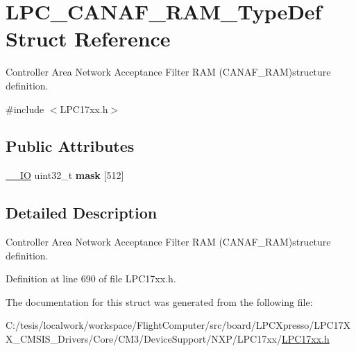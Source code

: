 \hypertarget{struct_l_p_c___c_a_n_a_f___r_a_m___type_def}{\section{\-L\-P\-C\-\_\-\-C\-A\-N\-A\-F\-\_\-\-R\-A\-M\-\_\-\-Type\-Def \-Struct \-Reference}
\label{struct_l_p_c___c_a_n_a_f___r_a_m___type_def}
}


\-Controller \-Area \-Network \-Acceptance \-Filter \-R\-A\-M (\-C\-A\-N\-A\-F\-\_\-\-R\-A\-M)structure definition.  




{\ttfamily \#include $<$\-L\-P\-C17xx.\-h$>$}

\subsection*{\-Public \-Attributes}
\begin{DoxyCompactItemize}
\item 
\hypertarget{struct_l_p_c___c_a_n_a_f___r_a_m___type_def_a4aa976ce2626f44c67748abac073c9b6}{\hyperlink{group___c_m_s_i_s__core__definitions_gaec43007d9998a0a0e01faede4133d6be}{\-\_\-\-\_\-\-I\-O} uint32\-\_\-t {\bfseries mask} \mbox{[}512\mbox{]}}\label{struct_l_p_c___c_a_n_a_f___r_a_m___type_def_a4aa976ce2626f44c67748abac073c9b6}

\end{DoxyCompactItemize}


\subsection{\-Detailed \-Description}
\-Controller \-Area \-Network \-Acceptance \-Filter \-R\-A\-M (\-C\-A\-N\-A\-F\-\_\-\-R\-A\-M)structure definition. 

\-Definition at line 690 of file \-L\-P\-C17xx.\-h.



\-The documentation for this struct was generated from the following file\-:\begin{DoxyCompactItemize}
\item 
\-C\-:/tesis/localwork/workspace/\-Flight\-Computer/src/board/\-L\-P\-C\-Xpresso/\-L\-P\-C17\-X\-X\-\_\-\-C\-M\-S\-I\-S\-\_\-\-Drivers/\-Core/\-C\-M3/\-Device\-Support/\-N\-X\-P/\-L\-P\-C17xx/\hyperlink{_l_p_c17xx_8h}{\-L\-P\-C17xx.\-h}\end{DoxyCompactItemize}
